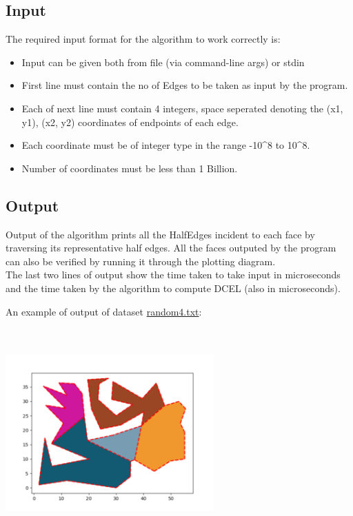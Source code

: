 \hypertarget{input}{%
\subsection{Input}\label{input}}

The required input format for the algorithm to work correctly is:

\begin{itemize}
\tightlist
\item
  Input can be given both from file (via command-line args) or stdin
\item
  First line must contain the no of Edges to be taken as input by the
  program.
\item
  Each of next line must contain 4 integers, space seperated denoting
  the (x1, y1), (x2, y2) coordinates of endpoints of each edge.
\item
  Each coordinate must be of integer type in the range -10\^{}8 to
  10\^{}8.
\item
  Number of coordinates must be less than 1 Billion.
\end{itemize}

\hypertarget{output}{%
\subsection{Output}\label{output}}

Output of the algorithm prints all the HalfEdges incident to each face
by traversing its representative half edges. All the faces outputed by
the program can also be verified by running it through the plotting
diagram.\\
The last two lines of output show the time taken to take input in
microseconds and the time taken by the algorithm to compute DCEL (also
in microseconds).

An example of output of dataset
\href{./datasets/random4.txt}{random4.txt}:

\includegraphics[width=8cm,height=8cm]{img/DCELrandom.png}\\


